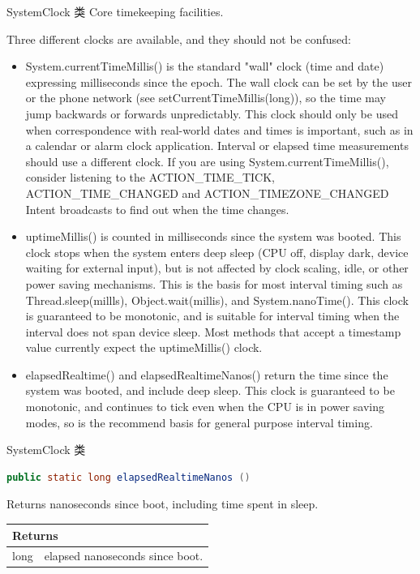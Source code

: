 \documentclass{beamer} %
\begin{document}
\begin{frame}[allowframebreaks]{SystemClock 类}
    Core timekeeping facilities.
    
    Three different clocks are available, and they should not be confused:\\
    \begin{itemize}
        \item System.currentTimeMillis() is the standard "wall" clock (time and date) expressing milliseconds since the epoch. 
        The wall clock can be set by the user or the phone network (see setCurrentTimeMillis(long)), 
        so the time may jump backwards or forwards unpredictably. 
        This clock should only be used when correspondence with real-world dates and times is important, 
        such as in a calendar or alarm clock application. 
        Interval or elapsed time measurements should use a different clock. 
        If you are using System.currentTimeMillis(), 
        consider listening to the ACTION\_TIME\_TICK, ACTION\_TIME\_CHANGED and ACTION\_TIMEZONE\_CHANGED Intent broadcasts to find out when the time changes.
        \item uptimeMillis() is counted in milliseconds since the system was booted. 
        This clock stops when the system enters deep sleep (CPU off, display dark, device waiting for external input), 
        but is not affected by clock scaling, idle, or other power saving mechanisms. 
        This is the basis for most interval timing such as Thread.sleep(millls), Object.wait(millis), and System.nanoTime(). 
        This clock is guaranteed to be monotonic, and is suitable for interval timing when the interval does not span device sleep. 
        Most methods that accept a timestamp value currently expect the uptimeMillis() clock.
        \item elapsedRealtime() and elapsedRealtimeNanos() return the time since the system was booted, and include deep sleep. 
        This clock is guaranteed to be monotonic, and continues to tick even when the CPU is in power saving modes, 
        so is the recommend basis for general purpose interval timing.
    \end{itemize}
\end{frame}

\begin{frame}[fragile]{SystemClock 类}
\label{CLASSSystemClockMETHODelapsedRealtimeNanos}
    \begin{lstlisting}[language = Java]
public static long elapsedRealtimeNanos ()
    \end{lstlisting}
    Returns nanoseconds since boot, including time spent in sleep.
    \begin{tabularx}{\textwidth}{l|X}
        \toprule
        \multicolumn{2}{l}{Returns}\\
        \midrule
        long & elapsed nanoseconds since boot.\\
        \bottomrule
    \end{tabularx}
\end{frame}
\end{document}
